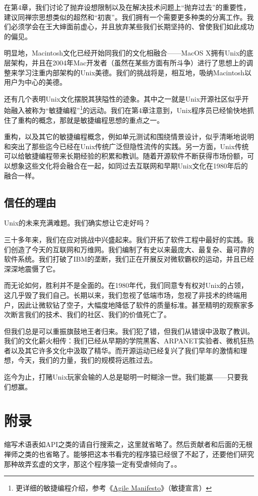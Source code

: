 \documentclass[12pt,oneside]{ctexbook}
\begin{document}
\begin{common-format}
在第4章，我们讨论了抛弃设想限制以及在解决技术问题上“抛弃过去”的重要性，建议同禅宗思想类似的超然和“初衷”。我们拥有一个需要更多种类的分离工作。我们必须学会在王大婶面前虚心，并且放弃某些我们长期坚持的、曾使我们如此成功的偏见。

明显地，Macintosh文化已经开始同我们的文化相融合——MacOS X拥有Unix的底层架构，并且在2004年Mac开发者（虽然在某些方面有所斗争）进行了思想上的调整来学习注重内部架构的Unix美德。我们的挑战将是，相互地，吸纳Macintosh以用户为中心的美德。

还有几个表明Unix文化摆脱其狭隘性的迹象。其中之一就是Unix开源社区似乎开始融入被称为“敏捷编程”\footnote{更详细的敏捷编程介绍，参考《\href{http://agilemanifesto.org/}{Agile Manifesto}》（敏捷宣言）}的远动。我们在第4章注意到，Unix程序员已经愉快地抓住了重构的概念，那就是敏捷编程思想的重点之一。

重构，以及其它的敏捷编程概念，例如单元测试和围绕情景设计，似乎清晰地说明和突出了那些迄今已经在Unix传统广泛但隐性流传的实践。另一方面，Unix传统可以给敏捷编程带来长期经验的积累和教训。随着开源软件不断获得市场份额，可以想象这些文化将会融合在一起，如同过去互联网和早期Unix文化在1980年后的融合一样。

\section{信任的理由}
Unix的未来充满难题。我们确实想让它走好吗？

三十多年来，我们在应对挑战中兴盛起来。我们开拓了软件工程中最好的实践。我们创造了今天的互联网和万维网。我们编制了有史以来最庞大、最复杂、最可靠的软件系统。我们打破了IBM的垄断，我们正在开展反对微软霸权的运动，并且已经深深地震慑了它。

而无论如何，胜利并不是全面的。在1980年代，我们同意专有权对Unix的占领，这几乎毁了我们自己。长期以来，我们忽视了低端市场，忽视了非技术的终端用户，因此让微软钻了空子，大幅度地降低了软件的质量标准。甚至精明的观察家多次断言我们的技术、我们的社区、我们的价值死亡了。

但我们总是可以重振旗鼓地王者归来。我们犯了错，但我们从错误中汲取了教训。我们的文化薪火相传：我们已经从早期的学院黑客、ARPANET实验者、微机狂热者以及其它许多文化中汲取了精华。而开源运动已经复兴了我们早年的激情和理想，今天，我们的力量，我们的规模将远胜过去。

迄今为止，打赌Unix玩家会输的人总是聪明一时糊涂一世。我们能赢——只要我们想赢。

\chapter{附录}
缩写术语表如API之类的请自行搜索之，这里就省略了。然后贡献者和后面的无根禅师之类的也省略了。能够把这本书看完的程序猿已经很了不起了，还要他们研究那种故弄玄虚的文字，那这个程序猿一定有受虐倾向了。。


\end{common-format}
\end{document}

